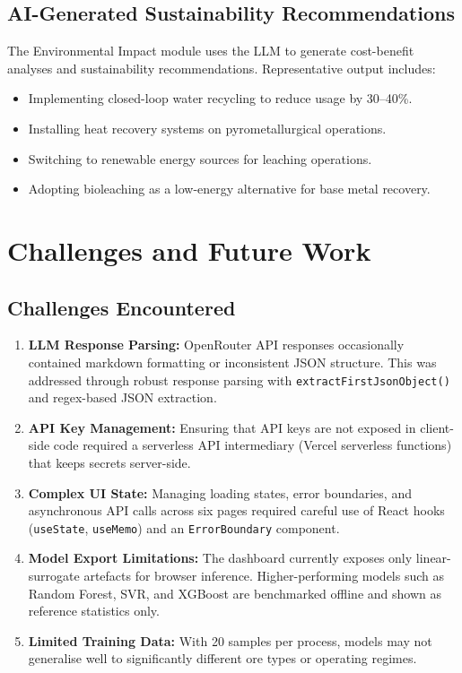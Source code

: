 \documentclass[12pt,a4paper]{report}
\newcommand{\code}[1]{\texttt{#1}}
\begin{document}
\section{AI-Generated Sustainability Recommendations}

The Environmental Impact module uses the LLM to generate cost-benefit analyses and sustainability recommendations. Representative output includes:

\begin{itemize}[nosep]
  \item Implementing closed-loop water recycling to reduce usage by 30–40\%.
  \item Installing heat recovery systems on pyrometallurgical operations.
  \item Switching to renewable energy sources for leaching operations.
  \item Adopting bioleaching as a low-energy alternative for base metal recovery.
\end{itemize}


\chapter{Challenges and Future Work}
\label{ch:challenges}

\section{Challenges Encountered}

\begin{enumerate}
  \item \textbf{LLM Response Parsing:} OpenRouter API responses occasionally contained markdown formatting or inconsistent JSON structure. This was addressed through robust response parsing with \code{extractFirstJsonObject()} and regex-based JSON extraction.

  \item \textbf{API Key Management:} Ensuring that API keys are not exposed in client-side code required a serverless API intermediary (Vercel serverless functions) that keeps secrets server-side.

  \item \textbf{Complex UI State:} Managing loading states, error boundaries, and asynchronous API calls across six pages required careful use of React hooks (\code{useState}, \code{useMemo}) and an \code{ErrorBoundary} component.

  \item \textbf{Model Export Limitations:} The dashboard currently exposes only linear-surrogate artefacts for browser inference. Higher-performing models such as Random Forest, SVR, and XGBoost are benchmarked offline and shown as reference statistics only.

  \item \textbf{Limited Training Data:} With 20 samples per process, models may not generalise well to significantly different ore types or operating regimes.
\end{enumerate}
\end{document}
